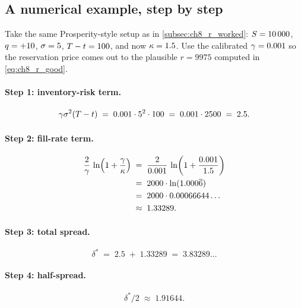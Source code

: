 \subsection{A numerical example, step by step}
\label{subsec:ch8_delta_numeric}

Take the same Prosperity-style setup as in \cref{subsec:ch8_r_worked}:
$S = 10\,000$, $q = +10$, $\sigma = 5$, $T - t = 100$,
and now $\kappa = 1.5$. Use the calibrated $\gamma = 0.001$ so
the reservation price comes out to the plausible $r = 9975$
computed in \eqref{eq:ch8_r_good}.

\paragraph{Step 1: inventory-risk term.}
\begin{equation}
  \gamma \sigma^2 (T - t)
  \;=\; 0.001 \cdot 5^2 \cdot 100
  \;=\; 0.001 \cdot 2500
  \;=\; 2.5.
\end{equation}

\paragraph{Step 2: fill-rate term.}
\begin{align}
  \frac{2}{\gamma}\,
    \ln\!\left(1 + \frac{\gamma}{\kappa}\right)
  \;&=\; \frac{2}{0.001}\,
         \ln\!\left(1 + \frac{0.001}{1.5}\right) \nonumber\\
  \;&=\; 2000 \cdot \ln(1.000\overline{6}) \nonumber\\
  \;&=\; 2000 \cdot 0.00066644\ldots \nonumber\\
  \;&\approx\; 1.33289.
\end{align}

\paragraph{Step 3: total spread.}
\begin{equation}
  \delta^*
  \;=\; 2.5 \;+\; 1.33289
  \;=\; 3.83289\ldots
  \label{eq:ch8_numerical_delta_star}
\end{equation}

\paragraph{Step 4: half-spread.}
\begin{equation}
  \delta^* / 2 \;\approx\; 1.91644.
\end{equation}

